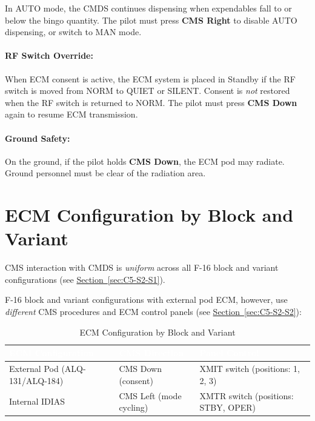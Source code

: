 \documentclass[11pt, a4paper, twoside]{report}
\newcommand{\secref}[1]{\hyperref[#1]{Section~\ref*{#1}}}
\begin{document}
In AUTO mode, the CMDS continues dispensing when expendables fall to or below the bingo quantity. The pilot must press \textbf{CMS Right} to disable AUTO dispensing, or switch to MAN mode.

\paragraph{RF Switch Override:}

When ECM consent is active, the ECM system is placed in Standby if the RF switch is moved from NORM to QUIET or SILENT. Consent is \textit{not} restored when the RF switch is returned to NORM. The pilot must press \textbf{CMS Down} again to resume ECM transmission.

\paragraph{Ground Safety:}

On the ground, if the pilot holds \textbf{CMS Down}, the ECM pod may radiate. Ground personnel must be clear of the radiation area.

\section{ECM Configuration by Block and Variant}
\label{sec:C5-S3}

CMS interaction with CMDS is \textit{uniform} across all F-16 block and variant configurations (see \secref{sec:C5-S2-S1}).

F-16 block and variant configurations with external pod ECM, however, use \textit{different} CMS procedures and ECM control panels (see \secref{sec:C5-S2-S2}):

\begin{table}[H]
\centering
\caption{ECM Configuration by Block and Variant}
\label{tab:C5-S3-ecm-config-summary}
\small
\renewcommand{\arraystretch}{1.25}
\begin{tabular}{|>{\raggedright\arraybackslash}p{3.6cm}|>{\raggedright\arraybackslash}p{3.6cm}|>{\raggedright\arraybackslash}p{4.6cm}|}
\hline
\rowcolor{headerblue}
\textcolor{white}{\textbf{ECM Configuration}} & \textcolor{white}{\textbf{CMS Direction}} & \textcolor{white}{\textbf{Panel Control}} \\
\hline
External Pod (ALQ-131/ALQ-184) & CMS Down (consent) & XMIT switch (positions: 1, 2, 3) \\
\hline
Internal IDIAS & CMS Left (mode cycling) & XMTR switch (positions: STBY, OPER) \\
\hline
\end{tabular}
\end{table}
\end{document}
